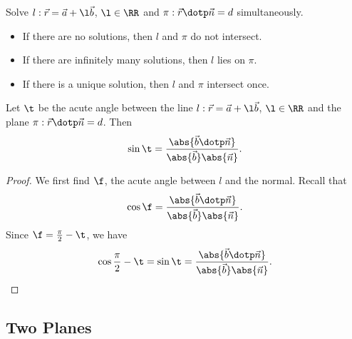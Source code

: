 \begin{recipe}
    Solve $l : \vec r = \vec a + \l \vec b$, $\l \in \RR$ and $\pi : \vec r \dotp \vec n = d$ simultaneously.
    \begin{itemize}
        \item If there are no solutions, then $l$ and $\pi$ do not intersect.
        \item If there are infinitely many solutions, then $l$ lies on $\pi$.
        \item If there is a unique solution, then $l$ and $\pi$ intersect once.
    \end{itemize}
\end{recipe}

\begin{proposition}
    Let $\t$ be the acute angle between the line $l : \vec r = \vec a + \l \vec b$, $\l \in \RR$ and the plane $\pi : \vec r \dotp \vec n = d$. Then \[\sin \t = \frac{\abs{\vec b \dotp \vec n}}{\abs{\vec b} \abs{\vec n}}.\]
\end{proposition}
\begin{proof}
    We first find $\f$, the acute angle between $l$ and the normal. Recall that \[\cos \f = \frac{\abs{\vec b \dotp \vec n}}{\abs{\vec b} \abs{\vec n}}.\] Since $\f = \frac\pi2 - \t$, we have \[\cos{\frac\pi2 - \t} = \sin \t = \frac{\abs{\vec b \dotp \vec n}}{\abs{\vec b} \abs{\vec n}}.\]
\end{proof}

\subsection{Two Planes}

